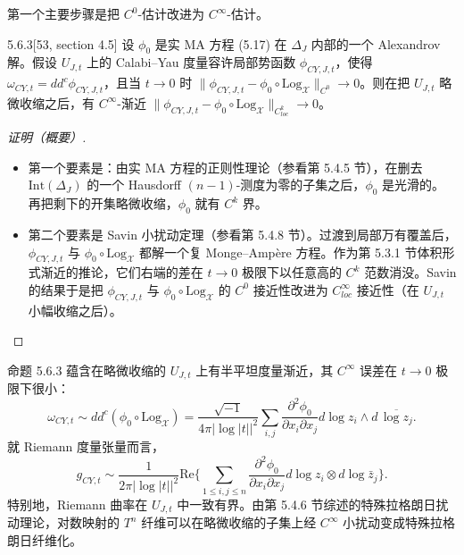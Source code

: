 第一个主要步骤是把 $C^0$-估计改进为 $C^\infty$-估计。

\begin{proposition}{5.6.3}[53, section 4.5]
设 $\phi_0$ 是实 MA 方程 (5.17) 在 $\Delta_J$ 内部的一个 Alexandrov 解。假设 $U_{J,t}$ 上的 Calabi--Yau 度量容许局部势函数 $\phi_{CY,J,t}$，使得 $\omega_{CY,t}=dd^c\phi_{CY,J,t}$，且当 $t\to 0$ 时 $\|\phi_{CY,J,t}-\phi_0\circ\mathrm{Log}_{\mathcal X}\|_{C^0}\to 0$。则在把 $U_{J,t}$ 略微收缩之后，有 $C^\infty$-渐近 $\|\phi_{CY,J,t}-\phi_0\circ\mathrm{Log}_{\mathcal X}\|_{C^k_{loc}}\to 0$。
\end{proposition}


\begin{proof}[证明（概要）]
\begin{itemize}
\item 第一个要素是：由实 MA 方程的正则性理论（参看第 5.4.5 节），在删去 $\mathrm{Int}(\Delta_J)$ 的一个 Hausdorff $(n-1)$-测度为零的子集之后，$\phi_0$ 是光滑的。再把剩下的开集略微收缩，$\phi_0$ 就有 $C^k$ 界。
\item 第二个要素是 Savin 小扰动定理（参看第 5.4.8 节）。过渡到局部万有覆盖后，$\phi_{CY,J,t}$ 与 $\phi_0\circ\mathrm{Log}_{\mathcal X}$ 都解一个复 Monge--Ampère 方程。作为第 5.3.1 节体积形式渐近的推论，它们右端的差在 $t\to 0$ 极限下以任意高的 $C^k$ 范数消没。Savin 的结果于是把 $\phi_{CY,J,t}$ 与 $\phi_0\circ\mathrm{Log}_{\mathcal X}$ 的 $C^0$ 接近性改进为 $C^\infty_{loc}$ 接近性（在 $U_{J,t}$ 小幅收缩之后）。\proofend
\end{itemize}
\end{proof}


命题 5.6.3 蕴含在略微收缩的 $U_{J,t}$ 上有半平坦度量渐近，其 $C^\infty$ 误差在 $t\to 0$ 极限下很小：
\begin{equation}
\omega_{CY,t}\sim dd^c(\phi_0\circ\mathrm{Log}_{\mathcal X})=\frac{\sqrt{-1}}{4\pi|\log|t||^2}\sum_{i,j}\frac{\partial^2\phi_0}{\partial x_i\partial x_j}d\log z_i\wedge d\,\overline{\log z_j}. \tag{5.19}
\end{equation}
就 Riemann 度量张量而言，
\begin{equation}
g_{CY,t}\sim\frac{1}{2\pi|\log|t||^2}\mathrm{Re}\Big\{\sum_{1\le i,j\le n}\frac{\partial^2\phi_0}{\partial x_i\partial x_j}d\log z_i\otimes d\log\bar z_j\Big\}. \tag{5.20}
\end{equation}
特别地，Riemann 曲率在 $U_{J,t}$ 中一致有界。由第 5.4.6 节综述的特殊拉格朗日扰动理论，对数映射的 $T^n$ 纤维可以在略微收缩的子集上经 $C^\infty$ 小扰动变成特殊拉格朗日纤维化。


